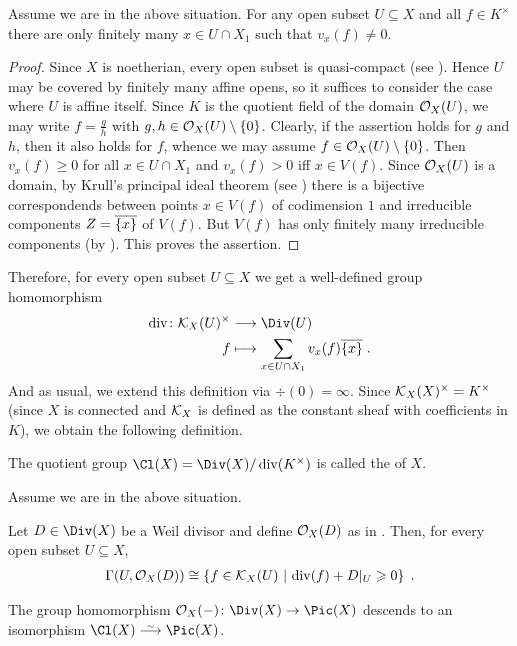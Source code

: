 \documentclass[a4paper,parskip=half,numbers=enddot, DIV=12]{scrreprt}
\renewcommand{\geq}{\geqslant}
\begin{document}
\begin{lem}
	Assume we are in the above situation. For any open subset $U\subseteq X$ and all $f\in K^\times$ there are only finitely many $x\in U\cap X_1$ such that $v_x(f)\neq 0$.
\end{lem}
\begin{proof}
	Since $X$ is noetherian, every open subset is quasi-compact (see \cite[Definition~2.1.2]{alg1}). Hence $U$ may be covered by finitely many affine opens, so it suffices to consider the case where $U$ is affine itself. Since $K$ is the quotient field of the domain $\mathcal{O}_X(U)$, we may write $f=\frac gh$ with $g,h\in\mathcal{O}_X(U)\setminus\{0\}$. Clearly, if the assertion holds for $g$ and $h$, then it also holds for $f$, whence we may assume $f\in\mathcal{O}_X(U)\setminus\{0\}$. Then $v_x(f)\geq 0$ for all $x\in U\cap X_1$ and $v_x(f)>0$ iff $x\in V(f)$. Since $\mathcal{O}_X(U)$ is a domain, by Krull's principal ideal theorem (see \cite[Theorem~11]{alg2}) there is a bijective correspondends between points $x\in V(f)$ of codimension $1$ and irreducible components $Z=\overline{\{x\}}$ of $V(f)$. But $V(f)$ has only finitely many irreducible components (by \cite[Proposition~2.1.1]{alg1}). This proves the assertion.
\end{proof}
Therefore, for every open subset $U\subseteq X$ we get a well-defined group homomorphism
\begin{align*}
	\div\colon \Kk_X(U)^\times&\morphism\Div(U)\\
	f&\longmapsto \sum_{x\in U\cap X_1}v_x(f)\ov{\{x\}}\;.
\end{align*}
And as usual, we extend this definition via $\div(0)=\infty$. Since $\mathcal{K}_X(X)^\times=K^\times$ (since $X$ is connected and $\mathcal{K}_X$ is defined as the constant sheaf with coefficients in $K$), we obtain the following definition.
\begin{defi}
	The quotient group $\Cl(X)=\Div(X)/\div(K^\times)$ is called the  of $X$.
\end{defi}
\begin{prop}
	Assume we are in the above situation.
	\begin{alphanumerate}
		\item Let $D\in \Div(X)$ be a Weil divisor and define $\mathcal{O}_X(D)$ as in . Then, for every open subset $U\subseteq X$,
		\begin{align*}
		\Gamma(U,\Oo_X(D))\cong \left\{f\in \Kk_X(U)\st\div(f)+D|_U\geq 0\right\}\;.
		\end{align*}
		\item The group homomorphism $\Oo_X(-)\colon \Div(X)\morphism\Pic(X)$ descends to an isomorphism $\Cl(X)\isomorphism\Pic(X)$.
	\end{alphanumerate}
\end{prop}
\end{document}
